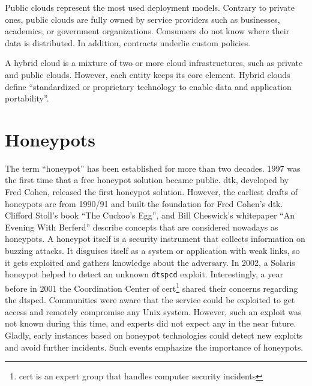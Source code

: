 Public clouds represent the most used deployment models.
Contrary to private ones, public clouds are fully owned by service providers such as businesses, academics, or government organizations.
Consumers do not know where their data is distributed.
In addition, contracts underlie custom policies. \cite{Mell2011}

A hybrid cloud is a mixture of two or more cloud infrastructures, such as private and public clouds.
However, each entity keeps its core element.
Hybrid clouds define \enquote{standardized or proprietary technology to enable data and application portability}\cite{Mell2011}.

\section{Honeypots}

The term \enquote{honeypot} has been established for more than two decades.
1997 was the first time that a free honeypot solution became public.
\ac{dtk}, developed by Fred Cohen, released the first honeypot solution.
However, the earliest drafts of honeypots are from 1990/91 and built the foundation for Fred Cohen's \ac*{dtk}.
Clifford Stoll's book \enquote{The Cuckoo's Egg}\cite{stroll2000}, and Bill Cheswick's whitepaper \enquote{An Evening With Berferd}\cite{Cheswick92} describe concepts that are considered nowadays as honeypots.\cite{Spitzner2003}
A honeypot itself is a security instrument that collects information on buzzing attacks.
It disguises itself as a system or application with weak links, so it gets exploited and gathers knowledge about the adversary.
In 2002, a Solaris honeypot helped to detect an unknown \verb|dtspcd| exploit.
Interestingly, a year before in 2001 the Coordination Center of \acs{cert}\footnote{\acl{cert} is an expert group that handles computer security incidents\cite{cert2021}} shared their concerns regarding the dtspcd.
Communities were aware that the service could be exploited to get access and remotely compromise any Unix system.
However, such an exploit was not known during this time, and experts did not expect any in the near future.
Gladly, early instances based on honeypot technologies could detect new exploits and avoid further incidents.
Such events emphasize the importance of honeypots.

